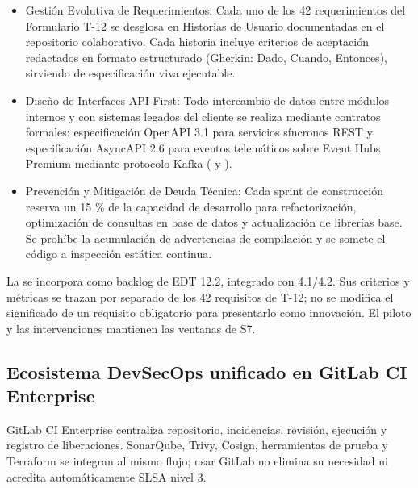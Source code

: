 \begin{itemize}
\item Gestión Evolutiva de Requerimientos: Cada uno de los 42 requerimientos del Formulario T-12 se desglosa en Historias de Usuario documentadas en el repositorio colaborativo. Cada historia incluye criterios de aceptación redactados en formato estructurado (Gherkin: Dado, Cuando, Entonces), sirviendo de especificación viva ejecutable.
\item Diseño de Interfaces API-First: Todo intercambio de datos entre módulos internos y con sistemas legados del cliente se realiza mediante contratos formales: especificación OpenAPI 3.1 para servicios síncronos REST y especificación AsyncAPI 2.6 para eventos telemáticos sobre Event Hubs Premium mediante protocolo Kafka ( y ).
\item Prevención y Mitigación de Deuda Técnica: Cada sprint de construcción reserva un 15 \% de la capacidad de desarrollo para refactorización, optimización de consultas en base de datos y actualización de librerías base. Se prohíbe la acumulación de advertencias de compilación y se somete el código a inspección estática continua.
\end{itemize}

La  se incorpora como backlog de EDT 12.2, integrado con 4.1/4.2. Sus criterios y métricas se trazan por separado de los 42 requisitos de T-12; no se modifica el significado de un requisito obligatorio para presentarlo como innovación. El piloto y las intervenciones mantienen las ventanas de S7.

\FloatBarrier
\subsection{Ecosistema DevSecOps unificado en GitLab CI Enterprise}\label{sec:6-desarrollo-devsecops}\label{sec:06-ecosistema-devsecops-unificado-en-gitlab-ci-enterprise}

GitLab CI Enterprise centraliza repositorio, incidencias, revisión, ejecución y registro de liberaciones. SonarQube, Trivy, Cosign, herramientas de prueba y Terraform se integran al mismo flujo; usar GitLab no elimina su necesidad ni acredita automáticamente SLSA nivel 3.


